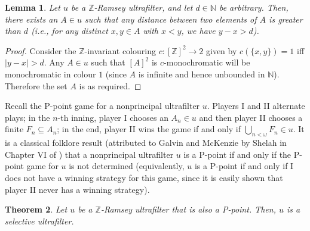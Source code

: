 \documentclass{amsart}
\newtheorem{theorem}{Theorem}[section]
\newtheorem{lemma}[theorem]{Lemma}
\theoremstyle{definition}
\theoremstyle{remark}
\numberwithin{equation}{section}
\begin{document}
\begin{lemma}\label{makedistancesbig}
Let $u$ be a $\mathbb Z$-Ramsey ultrafilter, and let $d\in\mathbb N$ be arbitrary. Then, there exists an $A\in u$ such that any distance between two elements of $A$ is greater than $d$ (i.e., for any distinct $x,y\in A$ with $x<y$, we have $y-x>d$).
\end{lemma}

\begin{proof}
    Consider the $\mathbb Z$-invariant colouring $c:[\mathbb Z]^2\longrightarrow 2$ given by $c(\{x,y\})=1$ iff $|y-x|>d$. Any $A\in u$ such that $[A]^2$ is $c$-monochromatic will be monochromatic in colour $1$ (since $A$ is infinite and hence unbounded in $\mathbb N$). Therefore the set $A$ is as required.
\end{proof}

Recall the P-point game for a nonprincipal ultrafilter $u$. Players I and II alternate plays; in the $n$-th inning, player I chooses an $A_n\in u$ and then player II chooses a finite $F_n\subseteq A_n$; in the end, player II wins the game if and only if $\bigcup_{n<\omega}F_n\in u$. It is a classical folklore result (attributed to Galvin and McKenzie by Shelah in Chapter VI of \cite{MR1623206}) that a nonprincipal ultrafilter $u$ is a P-point if and only if the P-point game for $u$ is not determined (equivalently, $u$ is a P-point if and only if I does not have a winning strategy for this game, since it is easily shown that player II never has a winning strategy).

\begin{theorem}\label{z-ramsey+ppointimpliesselective}
    Let $u$ be a $\mathbb Z$-Ramsey ultrafilter that is also a P-point. Then, $u$ is a selective ultrafilter.
\end{theorem}
\end{document}
